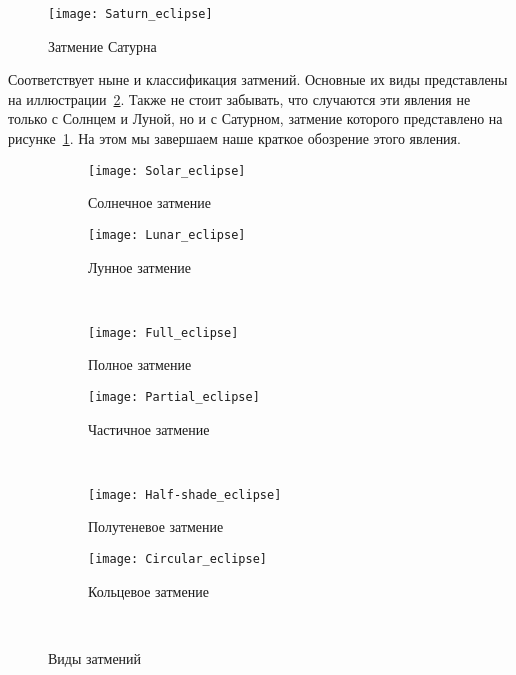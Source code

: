 \documentclass[30pt]{article}
\begin{document}
        \begin{figure}[h!]
            \centering
            \texttt{[image: Saturn\_eclipse]}
            \caption{Затмение Сатурна}
            \label{pic:saturn}
        \end{figure}
        
        \noindent Соответствует ныне и классификация затмений. Основные их виды представлены на иллюстрации~\ref{pic:eclipses}. Также не стоит забывать, что случаются эти явления не только с Солнцем и Луной, но и с Сатурном, затмение которого представлено на рисунке~\ref{pic:saturn}. На этом мы завершаем наше краткое обозрение этого явления.
        \begin{figure}[p]
            \centering
            \begin{subfigure}[b]{0.45\textwidth}
                \texttt{[image: Solar\_eclipse]}
                \caption{Солнечное затмение}
            \end{subfigure}
            \begin{subfigure}[b]{0.45\textwidth}
                \texttt{[image: Lunar\_eclipse]}
                \caption{Лунное затмение}
            \end{subfigure}\\
            \begin{subfigure}[b]{0.45\textwidth}
                \texttt{[image: Full\_eclipse]}
                \caption{Полное затмение}
            \end{subfigure}
            \begin{subfigure}[b]{0.45\textwidth}
                \texttt{[image: Partial\_eclipse]}
                \caption{Частичное затмение}
            \end{subfigure}\\
            \begin{subfigure}[b]{0.45\textwidth}
                \texttt{[image: Half-shade\_eclipse]}
                \caption{Полутеневое затмение}
            \end{subfigure}
            \begin{subfigure}[b]{0.45\textwidth}
                \texttt{[image: Circular\_eclipse]}
                \caption{Кольцевое затмение}
            \end{subfigure}\\
            \caption{Виды затмений}
            \label{pic:eclipses}
            
        \end{figure}\\
\end{document}
